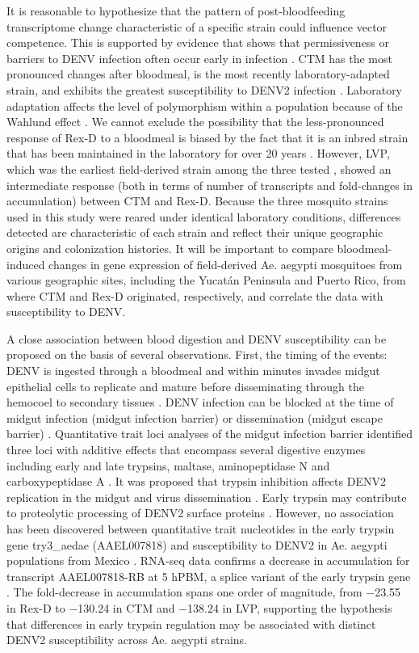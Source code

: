 It is reasonable to hypothesize that the pattern of post-bloodfeeding transcriptome change characteristic of a specific strain could influence vector competence. This is supported by evidence that shows that permissiveness or barriers to DENV infection often occur early in infection \cite{Black2002}. CTM has the most pronounced changes after bloodmeal, is the most recently laboratory-adapted strain, and exhibits the greatest susceptibility to DENV2 infection \cite{Salazar2007}. Laboratory adaptation affects the level of polymorphism within a population because of the Wahlund effect \cite{Wahlund2010}. We cannot exclude the possibility that the less-pronounced response of Rex-D to a bloodmeal is biased by the fact that it is an inbred strain that has been maintained in the laboratory for over 20 years \cite{Miller1991}. However, LVP, which was the earliest field-derived strain among the three tested \cite{MACDONALD1963}, showed an intermediate response (both in terms of number of transcripts and fold-changes in accumulation) between CTM and Rex-D. Because the three mosquito strains used in this study were reared under identical laboratory conditions, differences detected are characteristic of each strain and reflect their unique geographic origins and colonization histories. It will be important to compare bloodmeal-induced changes in gene expression of field-derived Ae. aegypti mosquitoes from various geographic sites, including the Yucatán Peninsula and Puerto Rico, from where CTM and Rex-D originated, respectively, and correlate the data with susceptibility to DENV.

A close association between blood digestion and DENV susceptibility can be proposed on the basis of several observations. First, the timing of the events: DENV is ingested through a bloodmeal and within minutes invades midgut epithelial cells to replicate and mature before disseminating through the hemocoel to secondary tissues \cite{Mosso2008,Salazar2007}. DENV infection can be blocked at the time of midgut infection (midgut infection barrier) or dissemination (midgut escape barrier) \cite{Black2002}. Quantitative trait loci analyses of the midgut infection barrier identified three loci with additive effects that encompass several digestive enzymes including early and late trypsins, maltase, aminopeptidase N and carboxypeptidase A \cite{Black2002,Gomez-Machorro2004}. It was proposed that trypsin inhibition affects DENV2 replication in the midgut and virus dissemination \cite{Molina-Cruz2005}. Early trypsin may contribute to proteolytic processing of DENV2 surface proteins \cite{Gorrochotegui-Escalante2005}. However, no association has been discovered between quantitative trait nucleotides in the early trypsin gene try3_aedae (AAEL007818) and susceptibility to DENV2 in Ae. aegypti populations from Mexico \cite{Gorrochotegui-Escalante2005}. RNA-seq data confirms a decrease in accumulation for transcript AAEL007818-RB at 5 hPBM, a splice variant of the early trypsin gene \cite{Noriega1999}. The fold-decrease in accumulation spans one order of magnitude, from −23.55 in Rex-D to −130.24 in CTM and −138.24 in LVP, supporting the hypothesis that differences in early trypsin regulation may be associated with distinct DENV2 susceptibility across Ae. aegypti strains.

